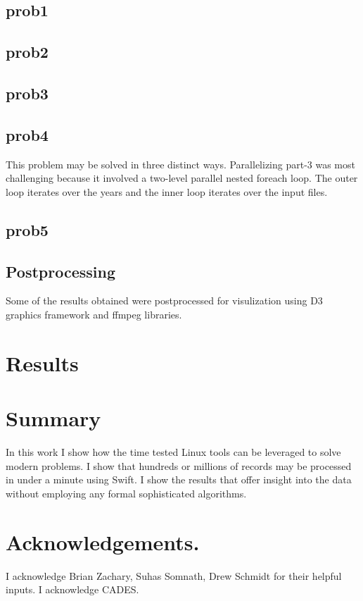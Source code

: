 \documentclass{report}
\begin{document}
\subsection*{prob1}

\subsection*{prob2}

\subsection*{prob3}

\subsection*{prob4}
This problem may be solved in three distinct ways. Parallelizing part-3 was
most challenging because it involved a two-level parallel nested foreach loop.
The outer loop iterates over the years and the inner loop iterates over the
input files.

\subsection*{prob5}

\subsection*{Postprocessing}
Some of the results obtained were postprocessed for visulization using D3
graphics framework and ffmpeg libraries.

\section*{Results}

\section*{Summary}
In this work I show how the time tested Linux tools can be leveraged to solve
modern problems. I show that hundreds or millions of records may be processed
in under a minute using Swift. I show the results that offer insight into the
data without employing any formal sophisticated algorithms.

\section*{Acknowledgements.}
I acknowledge Brian Zachary, Suhas Somnath, Drew Schmidt for their helpful
inputs. I acknowledge CADES.
\end{document}
